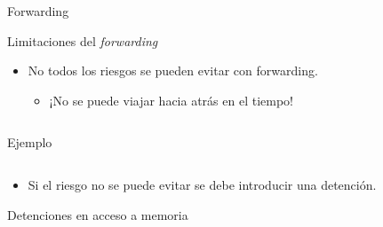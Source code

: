 \begin{frame}[t]{Forwarding}
\makebox[\textwidth][c]{

}
\end{frame}

\begin{frame}[t,fragile]{Limitaciones del \emph{forwarding}}
\begin{itemize}
  \item No todos los riesgos se pueden evitar con forwarding.
    \begin{itemize}
      \item ¡No se puede viajar hacia atrás en el tiempo!
    \end{itemize}
\end{itemize}

\begin{columns}

\begin{column}{.4\textwidth}
\begin{block}{Ejemplo}

\end{block}
\end{column}

\begin{column}{.6\textwidth}
\makebox[\textwidth][c]{

}
\end{column}

\end{columns}
\begin{itemize}
  \item Si el riesgo no se puede evitar se debe introducir una detención.
\end{itemize}

\end{frame}

\begin{frame}[t]{Detenciones en acceso a memoria}
\makebox[\textwidth][c]{

}
\end{frame}

